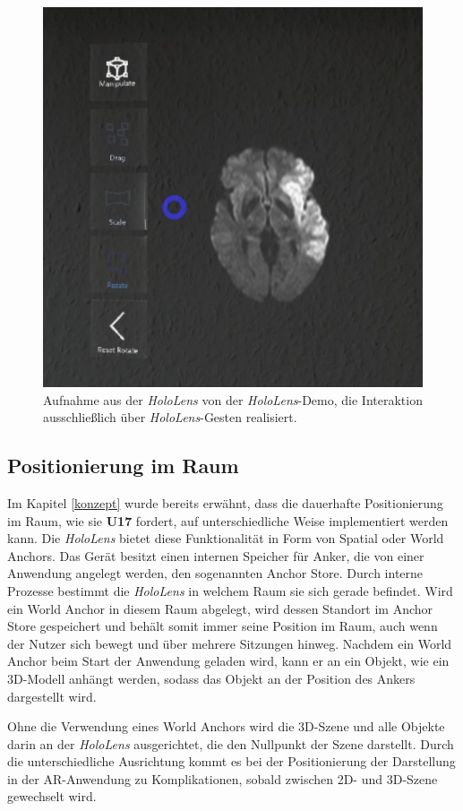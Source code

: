 \begin{figure}[!htb]
	\centering
	\includegraphics[width=0.5\linewidth]{images/hololens_prototyp.jpg}
	\caption{Aufnahme aus der \textit{HoloLens} von der \textit{HoloLens}-Demo, die Interaktion ausschließlich über \textit{HoloLens}-Gesten realisiert.}
	\label{img:prototyp}
\end{figure}
\FloatBarrier

\subsection{Positionierung im Raum}
\label{anchor}

Im Kapitel \ref{konzept} wurde bereits erwähnt, dass die dauerhafte Positionierung im Raum, wie sie \textbf{U17} fordert, auf unterschiedliche Weise implementiert werden kann. 
Die \textit{HoloLens} bietet diese Funktionalität in Form von Spatial oder World Anchors. Das Gerät besitzt einen internen Speicher für Anker, die von einer Anwendung angelegt werden, den sogenannten Anchor Store. Durch interne Prozesse bestimmt die \textit{HoloLens} in welchem Raum sie sich gerade befindet. Wird ein World Anchor in diesem Raum abgelegt, wird dessen Standort im Anchor Store gespeichert und behält somit immer seine Position im Raum, auch wenn der Nutzer sich bewegt und über mehrere Sitzungen hinweg. Nachdem ein World Anchor beim Start der Anwendung geladen wird, kann er an ein Objekt, wie ein 3D-Modell anhängt werden, sodass das Objekt an der Position des Ankers dargestellt wird. 

Ohne die Verwendung eines World Anchors wird die 3D-Szene und alle Objekte darin an der \textit{HoloLens} ausgerichtet, die den Nullpunkt der Szene darstellt. Durch die unterschiedliche Ausrichtung kommt es bei der Positionierung der Darstellung in der AR-Anwendung zu Komplikationen, sobald zwischen 2D- und 3D-Szene gewechselt wird. 

